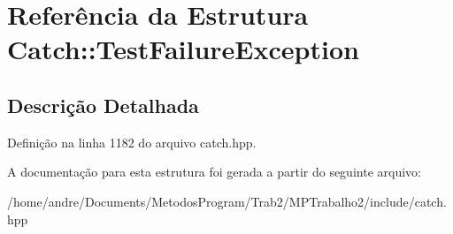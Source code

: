 \hypertarget{structCatch_1_1TestFailureException}{}\section{Referência da Estrutura Catch\+:\+:Test\+Failure\+Exception}
\label{structCatch_1_1TestFailureException}


\subsection{Descrição Detalhada}


Definição na linha 1182 do arquivo catch.\+hpp.



A documentação para esta estrutura foi gerada a partir do seguinte arquivo\+:\begin{DoxyCompactItemize}
\item 
/home/andre/\+Documents/\+Metodos\+Program/\+Trab2/\+M\+P\+Trabalho2/include/catch.\+hpp\end{DoxyCompactItemize}
